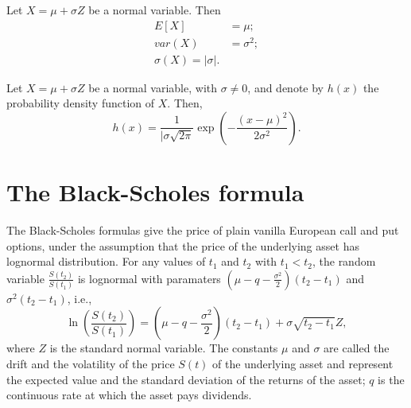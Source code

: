 \begin{lemma}
    Let $ X = \mu + \sigma Z $ be a normal variable.
    Then
    \begin{align}
        E[X] &= \mu; \\
        var(X) &= \sigma^2; \\
        \sigma(X) = | \sigma |.
    \end{align}
\end{lemma}

\begin{lemma}
    Let $ X = \mu + \sigma Z $ be a normal variable, with $ \sigma \neq 0 $, and
        denote by $ h(x) $ the probability density function of $ X $.
    Then,
    \begin{equation}
        h(x) = \frac{1}{| \sigma  \sqrt{2 \pi}} \exp \left(
            -\frac{(x - \mu)^2}{2 \sigma^2} \right).
    \end{equation}
\end{lemma}

\section{The Black-Scholes formula}
The Black-Scholes formulas give the price of plain vanilla European call and put
    options, under the assumption that the price of the underlying asset has
    lognormal distribution.
For any values of $ t_1 $ and $ t_2 $ with $ t_1 < t_2 $, the random variable
    $ \frac{S(t_2)}{S(t_1)} $ is lognormal with paramaters
    $ \left( \mu - q - \frac{\sigma^2}{2} \right) (t_2 - t_1) $ and
    $ \sigma^2 (t_2 - t_1) $, i.e.,
\begin{equation}
    \ln \left( \frac{S(t_2)}{S(t_1)} \right) = \left( \mu - q -
        \frac{\sigma^2}{2} \right) (t_2 - t_1) + \sigma \sqrt{t_2 - t_1} Z,
\end{equation}
where $ Z $ is the standard normal variable.
The constants $ \mu $ and $ \sigma $ are called the drift and the volatility of
    the price $ S(t) $ of the underlying asset and represent the expected value
    and the standard deviation of the returns of the asset; $ q $ is the
    continuous rate at which the asset pays dividends.
